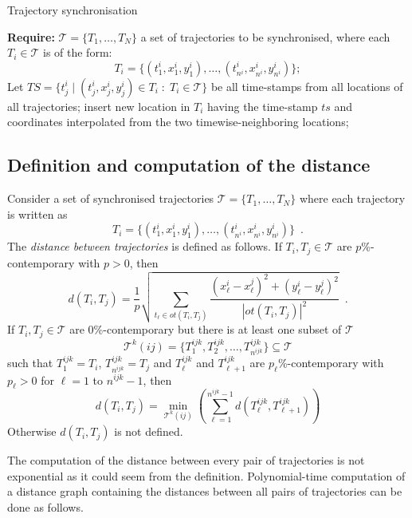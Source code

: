\begin{algorithm}[!ht]
\caption{Trajectory synchronisation} \label{alg:sync}
\begin{algorithmic}[1]
\STATE \textbf{Require:} $\mathcal{T} = \{ T_1, \ldots, T_N \}$ a set of trajectories to be
synchronised, where each $T_i \in \mathcal{T}$ is of the form:
\[ T_i = \{ (t^i_1,x^i_1,y^i_1), \ldots, (t^i_{n^i},x^i_{n^i},y^i_{n^i})\}; \]
\STATE Let $TS = \{ t^i_j \;|\; (t^i_j,x^i_j,y^i_j) \in T_i \;:\; T_i \in
\mathcal{T} \}$ be all time-stamps from all locations of all trajectories;
      \STATE insert new location in $T_i$ having the time-stamp $ts$ and
      coordinates interpolated from the two timewise-neighboring locations;
    \ENDIF
  \ENDFOR
\ENDFOR
\end{algorithmic}
\end{algorithm}

\subsection{Definition and computation of the distance}
\label{comput}

\begin{definition} \label{def:distance}
Consider a set of synchronised trajectories $\mathcal{T}= \{ T_1, \ldots,
T_N\}$ where each trajectory is written as
\[T_i = \{ (t^i_1,x^i_1,y^i_1), \ldots, (t^i_{n^i},x^i_{n^i},y^i_{n^i})\}
\enspace . \]
The \emph{distance between trajectories} is defined as follows.
If $T_i, T_j \in \mathcal{T}$ are $p$\%-contemporary with $p >0$, then
\[ d(T_i, T_j) = \frac{1}{p} \sqrt{\sum_{t_\ell \in ot(T_i,T_j)}
\frac{(x^i_\ell - x^j_\ell)^2 + (y^i_\ell - y^j_\ell)^2}{|ot(T_i,T_j)|^2}} \enspace . \]
If $T_i,T_j \in \mathcal{T}$ are $0$\%-contemporary but there is
at least one subset of $\mathcal{T}$
\[ \mathcal{T}^k(ij)=\{T^{ijk}_1, T^{ijk}_2, \ldots,T^{ijk}_{n^{ijk}} \}
\subseteq \mathcal{T} \]
such that $T^{ijk}_1=T_i$, $T^{ijk}_{n^{ijk}}=T_j$
and $T^{ijk}_\ell$ and $T^{ijk}_{\ell+1}$ are $p_\ell$\%-contemporary
with $p_\ell>0$ for $\ell=1$ to $n^{ijk}-1$, then
\[ d(T_i,T_j) = \min_{\mathcal{T}^k(ij)} \left(\sum_{\ell=1}^{n^{ijk}-1}
d(T^{ijk}_\ell, T^{ijk}_{\ell +1}) \right) \]
Otherwise $d(T_i, T_j)$ is not defined.
\end{definition}

The computation of the distance between every pair of trajectories is not
exponential as it could seem from the definition. Polynomial-time
computation of a distance graph containing the distances between all pairs
of trajectories can be done as follows.

